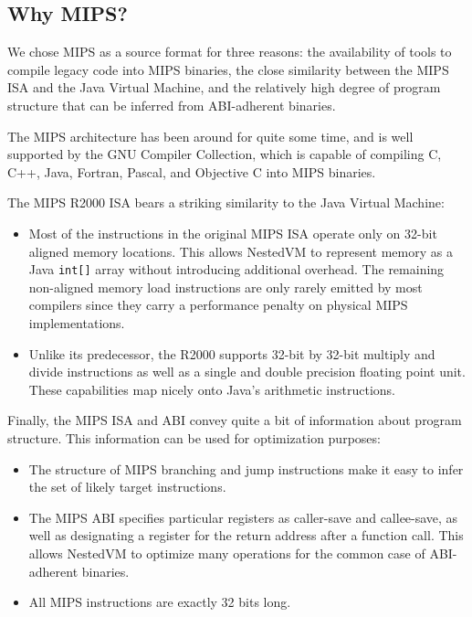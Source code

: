 \documentclass{acmconf}
\begin{document}
\subsection{Why MIPS?}

We chose MIPS as a source format for three reasons: the availability
of tools to compile legacy code into MIPS binaries, the close
similarity between the MIPS ISA and the Java Virtual Machine, and the
relatively high degree of program structure that can be inferred from
ABI-adherent binaries.

The MIPS architecture has been around for quite some time, and is well
supported by the GNU Compiler Collection, which is capable of
compiling C, C++, Java, Fortran, Pascal, and Objective C
into MIPS binaries.

The MIPS R2000 ISA bears a striking similarity to the Java Virtual
Machine:

\begin{itemize}

\item Most of the instructions in the original MIPS ISA operate only
      on 32-bit aligned memory locations. This allows NestedVM to
      represent memory as a Java {\tt int[]} array without introducing
      additional overhead.  The remaining non-aligned memory load
      instructions are only rarely emitted by most compilers since
      they carry a performance penalty on physical MIPS
      implementations.

\item Unlike its predecessor, the R2000 supports 32-bit by 32-bit
      multiply and divide instructions as well as a single and double
      precision floating point unit.  These capabilities map nicely
      onto Java's arithmetic instructions.

\end{itemize}

Finally, the MIPS ISA and ABI convey quite a bit of information about
program structure.  This information can be used for optimization
purposes:

\begin{itemize}

\item The structure of MIPS branching and jump instructions make it
      easy to infer the set of likely target instructions.

\item The MIPS ABI specifies particular registers as caller-save and
      callee-save, as well as designating a register for the return
      address after a function call.  This allows NestedVM to optimize
      many operations for the common case of ABI-adherent binaries.

\item All MIPS instructions are exactly 32 bits long.

\end{itemize}
\end{document}
